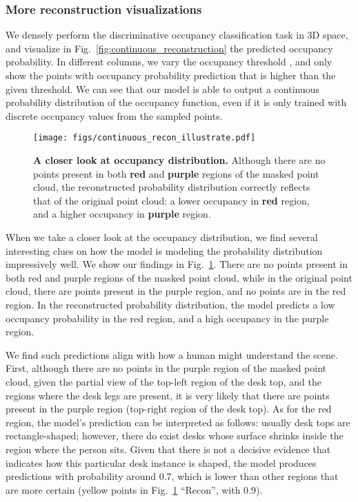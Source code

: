 \documentclass[runningheads]{llncs}
\begin{document}
\subsubsection{More reconstruction visualizations}
We densely perform the discriminative occupancy classification task in 3D space, and visualize in Fig.~\ref{fig:continuous_reconstruction} the predicted occupancy probability.  In different columns, we vary the occupancy threshold , and only show the points with occupancy probability prediction that is higher than the given threshold. We can see that our model is able to output a continuous probability distribution of the occupancy function, even if it is only trained with discrete occupancy values from the sampled points.


\begin{figure}[t!]
    \centering
    \texttt{[image: figs/continuous\_recon\_illustrate.pdf]}
    \caption{\textbf{A closer look at occupancy distribution.}  Although there are no points present in both {\color{myred} \bf red} and {\color{mypurple} \bf purple} regions of the masked point cloud, the reconstructed probability distribution correctly reflects that of the original point cloud: a lower occupancy in {\color{myred} \bf red} region, and a higher occupancy in {\color{mypurple} \bf purple} region.
    }
    \label{fig:reconstruction_illustrate}
\end{figure}

When we take a closer look at the occupancy distribution, we find several interesting clues on how the model is modeling the probability distribution impressively well. We show our findings in Fig.~\ref{fig:reconstruction_illustrate}.
There are no points present in both {\color{myred} red} and {\color{mypurple} purple} regions of the masked point cloud, while in the original point cloud, there are points present in the {\color{mypurple} purple} region, and no points are in the {\color{myred} red} region.
In the reconstructed probability distribution, the model predicts a low occupancy probability in the {\color{myred} red} region, and a high occupancy in the {\color{mypurple} purple} region.

We find such predictions align with how a human might understand the scene.
First, although there are no points in the purple region of the masked point cloud, given the partial view of the top-left region of the desk top, and the regions where the desk legs are present, it is very likely that there are points present in the purple region (top-right region of the desk top).
As for the red region, the model's prediction can be interpreted as follows: usually  desk tops are rectangle-shaped; however, there do exist desks whose surface shrinks inside the region where the person sits.  Given that there is not a decisive evidence that indicates how this particular desk instance is shaped, the model produces predictions with probability around 0.7, which is lower than other regions that are more certain (yellow points in Fig.~\ref{fig:reconstruction_illustrate} ``Recon'', with 0.9).
\end{document}
